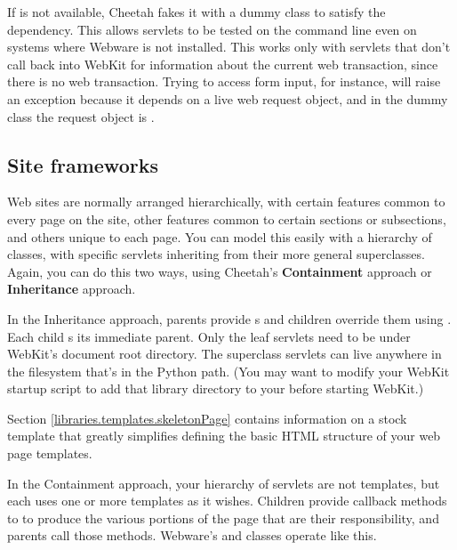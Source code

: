 If  is not available, Cheetah fakes it with a
dummy class to satisfy the dependency.  This allows servlets to be tested on
the command line even on systems where Webware is not installed.  This works
only with servlets that don't call back into WebKit for information about the
current web transaction, since there is no web transaction.  Trying to access
form input, for instance, will raise an exception because it depends on a
live web request object, and in the dummy class the request object is
.

\subsection{Site frameworks}
\label{webware.siteFrameworks}

Web sites are normally arranged hierarchically, with certain features common 
to every page on the site, other features common to certain sections or
subsections, and others unique to each page.  You can model this easily with
a hierarchy of classes, with specific servlets inheriting from their more
general superclasses.  Again, you can do this two ways, using Cheetah's
{\bf Containment} approach or {\bf Inheritance} approach.

In the Inheritance approach, parents provide s and children
override them using .  Each child s its immediate
parent.  Only the leaf servlets need to be under WebKit's document root
directory.  The superclass servlets can live anywhere in the filesystem
that's in the Python path.  (You may want to modify your WebKit startup 
script to add that library directory to your  before starting
WebKit.)


Section \ref{libraries.templates.skeletonPage} contains information on a stock
template that greatly simplifies defining the basic HTML structure of your web
page templates.  

In the Containment approach, your hierarchy of servlets are not templates, but
each uses one or more templates as it wishes.  Children provide callback
methods to to produce the various portions of the page that are their
responsibility, and parents call those methods.  Webware's 
and  classes operate like this.


